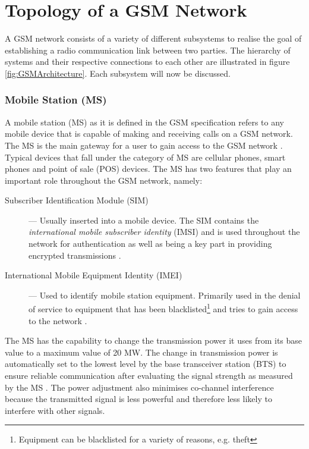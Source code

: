 \section{Topology of a GSM Network}
\label{sec:GSMArch}
A GSM network consists of a variety of different subsystems to realise the goal of establishing a radio communication link between two parties. The hierarchy of systems and their respective connections to each other are illustrated in figure \ref{fig:GSMArchitecture}. Each subsystem will now be discussed.
\subsubsection{Mobile Station (MS)}
A mobile station (MS) as it is defined in the GSM specification refers to any mobile device that is capable of making and receiving calls on a GSM network.  The MS is the main gateway 
for a user to gain access to the GSM network \cite{Eisenblatter,GSMArchitectureProtocolsServices}. Typical devices that fall under the category of MS are cellular phones, smart phones and point of sale (POS) devices. The MS has two features that play an important role throughout the GSM network, namely:
\begin{description}
\item[Subscriber Identification Module (SIM)] --- Usually inserted into a mobile device. The SIM contains the \emph{international mobile subscriber identity} (IMSI) and is used throughout the network for authentication as well as being a key part in providing encrypted transmissions \cite{Eisenblatter}.
\item[International Mobile Equipment Identity (IMEI)] --- Used to identify mobile station equipment. Primarily used in the denial of service to equipment that has been blacklisted\footnote{Equipment can be blacklisted for a variety of reasons, e.g. theft} and tries to gain access to the network \cite{Eisenblatter}.
\end{description}
The MS has the capability to change the transmission power it uses from its base value to a maximum value of 20 MW. The change in transmission power is automatically set to the lowest level by the base transceiver station (BTS) to ensure reliable communication after evaluating the signal strength as measured by the MS \cite{GSMSysEngin,GSMArchitectureProtocolsServices}. The power adjustment also minimises co-channel interference because the transmitted signal is less powerful and therefore less likely to interfere with other signals\cite{GSMSysEngin}.

